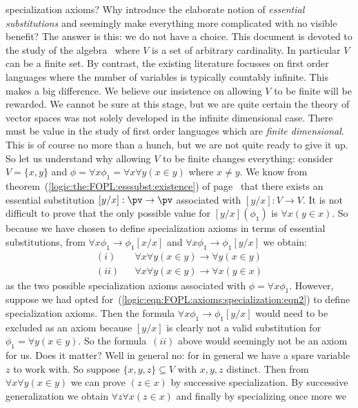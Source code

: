 specialization axioms? Why introduce the elaborate notion of {\em
essential substitutions} and seemingly make everything more
complicated with no visible benefit? The answer is this: we do not
have a choice. This document is devoted to the study of the algebra
\pv\ where $V$ is a set of arbitrary cardinality. In particular $V$
can be a finite set. By contrast, the existing literature focusses
on first order languages where the number of variables is typically
countably infinite. This makes a big difference. We believe our
insistence on allowing $V$ to be finite will be rewarded. We cannot
be sure at this stage, but we are quite certain the theory of vector
spaces was not solely developed in the infinite dimensional case.
There must be value in the study of first order languages which are
{\em finite dimensional}. This is of course no more than a hunch,
but we are not quite ready to give it up. So let us understand why
allowing $V$ to be finite changes everything: consider $V=\{x,y\}$
and $\phi=\forall x\phi_{1}=\forall x\forall y (x\in y)$ where
$x\neq y$. We know from
theorem~(\ref{logic:the:FOPL:esssubst:existence}) of
page~\pageref{logic:the:FOPL:esssubst:existence} that there exists
an essential substitution $[y/x]:\pv\to\pv$ associated with
$[y/x]:V\to V$. It is not difficult to prove that the only possible
value for $[y/x](\phi_{1})$ is $\forall x(y\in x)$. So because we
have chosen to define specialization axioms in terms of essential
substitutions, from $\forall x\phi_{1}\to\phi_{1}[x/x]$ and $\forall
x\phi_{1}\to\phi_{1}[y/x]$ we obtain:
    \begin{eqnarray*}
    (i)&&\forall x\forall y(x\in y)\to\forall y(x\in y)\\
    (ii)&&\forall x\forall y(x\in y)\to\forall x(y\in x)
    \end{eqnarray*}
as the two possible specialization axioms associated with
$\phi=\forall x\phi_{1}$. However, suppose we had opted
for~(\ref{logic:eqn:FOPL:axioms:specialization:eqn2}) to define
specialization axioms. Then the formula $\forall
x\phi_{1}\to\phi_{1}[y/x]$ would need to be excluded as an axiom
because $[y/x]$ is clearly not a valid substitution for
$\phi_{1}=\forall y(x\in y)$. So the formula~$(ii)$ above would
seemingly not be an axiom for us. Does it matter? Well in general
no: for in general we have a spare variable $z$ to work with. So
suppose $\{x,y,z\}\subseteq V$ with $x,y,z$ distinct. Then from
$\forall x\forall y(x\in y)$ we can prove $(z\in x)$ by successive
specialization. By successive generalization we obtain $\forall
z\forall x(z\in x)$ and finally by specializing once more we
